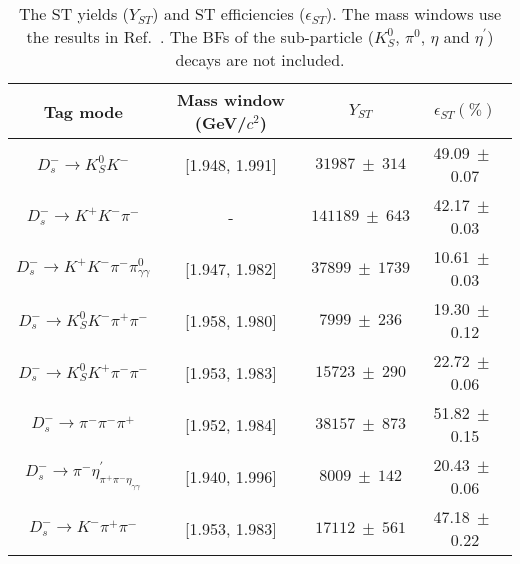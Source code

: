 \begin{table}[htbp]
    \caption{ The ST yields ($Y_{ST}$) and ST efficiencies ($\epsilon_{ST}$). 
    The mass windows use the results in Ref.~\cite{Doc-DB-630-v35}. 
The BFs of the sub-particle ($K_{S}^{0}$, $\pi^{0}$, $\eta$ and $\eta^{'}$) decays are not included.}
    \label{ST-eff}
    \begin{center}
        \begin{tabular}{cccc}
            \toprule\toprule
            Tag mode & Mass window (GeV/$c^{2}$)  & $Y_{ST}$  & $\epsilon_{ST}(\%)$\\
            \hline
            $D_{s}^{-} \rightarrow K_{S}^{0}K^{-}$                          & [1.948, 1.991]    & $31987\ \pm\ 314$               & 49.09$\ \pm\ $0.07\\
            $D_{s}^{-} \rightarrow K^{+}K^{-}\pi^{-}$                       & -                 & $141189\ \pm\ 643$              & 42.17$\ \pm\ $0.03\\
            $D_{s}^{-} \rightarrow K^{+}K^{-}\pi^{-}\pi^{0}_{\gamma\gamma}$                & [1.947, 1.982]    & $37899\ \pm\ 1739$              & 10.61$\ \pm\ $0.03\\
            $D_{s}^{-} \rightarrow K_{S}^{0}K^{-}\pi^{+}\pi^{-}$            & [1.958, 1.980]    & $7999\ \pm\ 236$               & 19.30$\ \pm\ $0.12\\
            $D_{s}^{-} \rightarrow K_{S}^{0}K^{+}\pi^{-}\pi^{-}$            & [1.953, 1.983]    & $15723\ \pm\ 290$               & 22.72$\ \pm\ $0.06\\
            $D_{s}^{-} \rightarrow \pi^{-}\pi^{-}\pi^{+}$                   & [1.952, 1.984]    & $38157\ \pm\ 873$              & 51.82$\ \pm\ $0.15\\
            $D_{s}^{-} \rightarrow \pi^{-}\eta_{\pi^{+}\pi^{-}\eta_{\gamma\gamma}}^{'}$          & [1.940, 1.996]    & $8009\ \pm\ 142$               & 20.43$\ \pm\ $0.06\\
            $D_{s}^{-} \rightarrow K^{-}\pi^{+}\pi^{-}$                     & [1.953, 1.983]    & $17112\ \pm\ 561$               & 47.18$\ \pm\ $0.22\\
            \bottomrule\bottomrule
        \end{tabular}
    \end{center}
\end{table}

